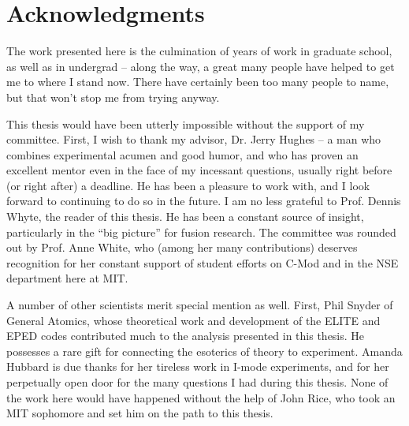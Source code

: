 
\chapter*{Acknowledgments}

The work presented here is the culmination of years of work in graduate school, as well as in undergrad -- along the way, a great many people have helped to get me to where I stand now.  There have certainly been too many people to name, but that won't stop me from trying anyway.

This thesis would have been utterly impossible without the support of my committee.  First, I wish to thank my advisor, Dr. Jerry Hughes -- a man who combines experimental acumen and good humor, and who has proven an excellent mentor even in the face of my incessant questions, usually right before (or right after) a deadline.  He has been a pleasure to work with, and I look forward to continuing to do so in the future.  I am no less grateful to Prof. Dennis Whyte, the reader of this thesis.  He has been a constant source of insight, particularly in the ``big picture'' for fusion research.  The committee was rounded out by Prof. Anne White, who (among her many contributions) deserves recognition for her constant support of student efforts on C-Mod and in the NSE department here at MIT.

A number of other scientists merit special mention as well.  First, Phil Snyder of General Atomics, whose theoretical work and development of the ELITE and EPED codes contributed much to the analysis presented in this thesis.  He possesses a rare gift for connecting the esoterics of theory to experiment.  Amanda Hubbard is due thanks for her tireless work in I-mode experiments, and for her perpetually open door for the many questions I had during this thesis.  None of the work here would have happened without the help of John Rice, who took an MIT sophomore and set him on the path to this thesis.


